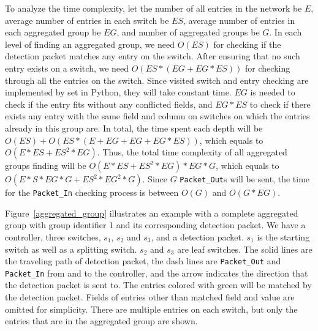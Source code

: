 To analyze the time complexity, let the number of all entries in the network be $E$, average number of entries in each switch be $ES$, average number of entries in each aggregated group be $EG$, and number of aggregated groups be $G$. In each level of finding an aggregated group, we need $O(ES)$ for checking if the detection packet matches any entry on the switch. After ensuring that no such entry exists on a switch, we need $O(ES*(EG+EG*ES))$ for checking through all the entries on the switch. Since visited switch and entry checking are implemented by set in Python, they will take constant time. $EG$ is needed to check if the entry fits without any conflicted fields, and $EG*ES$ to check if there exists any entry with the same field and column on switches on which the entries already in this group are. In total, the time spent each depth will be $O(ES) + O(ES* (E+EG+EG+EG*ES) )$, which equals to $O(E*ES + ES^2*EG)$. Thus, the total time complexity of all aggregated groups finding will be $O(E*ES + ES^2*EG) * EG * G$, which equals to $O(E*S*EG*G + ES^2*EG^2*G)$. Since $G$ \texttt{Packet\_Out}s will be sent, the time for the \texttt{Packet\_In} checking process is between $O(G)$ and $O(G*EG)$.

Figure~\ref{aggregated_group} illustrates an example with a complete aggregated group with group identifier 1 and its corresponding detection packet. We have a controller, three switches, $s_1$, $s_2$ and $s_3$, and a detection packet. $s_1$ is the starting switch as well as a splitting switch. $s_2$ and $s_3$ are leaf switches. The solid lines are the traveling path of detection packet, the dash lines are \texttt{Packet\_Out} and \texttt{Packet\_In} from and to the controller, and the arrow indicates the direction that the detection packet is sent to. The entries colored with green will be matched by the detection packet. Fields of entries other than matched field and value are omitted for simplicity. There are multiple entries on each switch, but only the entries that are in the aggregated group are shown.

